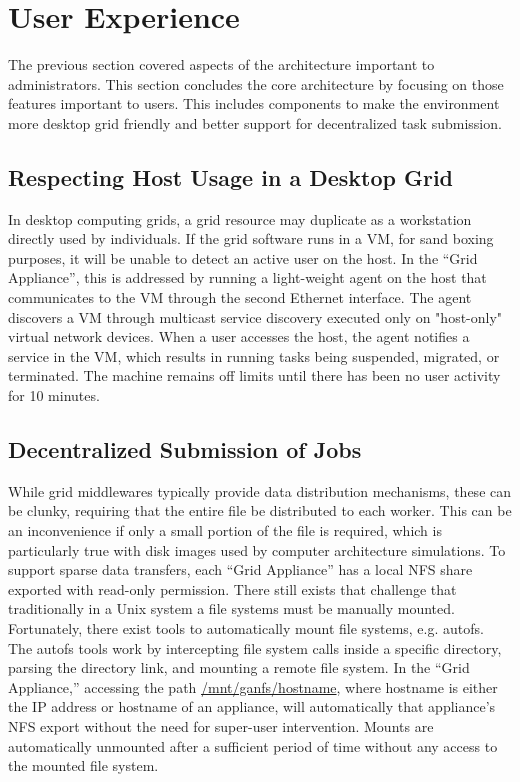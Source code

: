 \documentclass[conference]{IEEEtran}
\begin{document}
\section{User Experience}

The previous section covered aspects of the architecture important to
administrators.  This section concludes the core architecture by focusing on
those features important to users.  This includes components to make the
environment more desktop grid friendly and better support for decentralized
task submission.

\subsection{Respecting Host Usage in a Desktop Grid}

In desktop computing grids, a grid resource may duplicate as a workstation
directly used by individuals.  If the grid software runs in a VM, for sand
boxing purposes, it will be unable to detect an active user on the host.  In
the ``Grid Appliance'', this is addressed by running a light-weight agent on
the host that communicates to the VM through the second Ethernet interface.
The agent discovers a VM through multicast service discovery executed only on
"host-only" virtual network devices.  When a user accesses the host, the agent
notifies a service in the VM, which results in running tasks being suspended,
migrated, or terminated.  The machine remains off limits until there has been
no user activity for 10 minutes.

\subsection{Decentralized Submission of Jobs}

While grid middlewares typically provide data distribution mechanisms, these
can be clunky, requiring that the entire file be distributed to each worker.
This can be an inconvenience if only a small portion of the file is required,
which is particularly true with disk images used by computer architecture
simulations.  To support sparse data transfers, each ``Grid Appliance'' has a
local NFS share exported with read-only permission.  There still exists that
challenge that traditionally in a Unix system a file systems must be manually
mounted.  Fortunately, there exist tools to automatically mount file systems,
e.g.  autofs. The autofs tools work by intercepting file system calls inside a
specific directory, parsing the directory link, and mounting a remote file
system.  In the ``Grid Appliance,'' accessing the path
\url{/mnt/ganfs/hostname}, where hostname is either the IP address or hostname
of an appliance, will automatically that appliance's NFS export without the
need for super-user intervention.  Mounts are automatically unmounted after a
sufficient period of time without any access to the mounted file system.  
\end{document}
